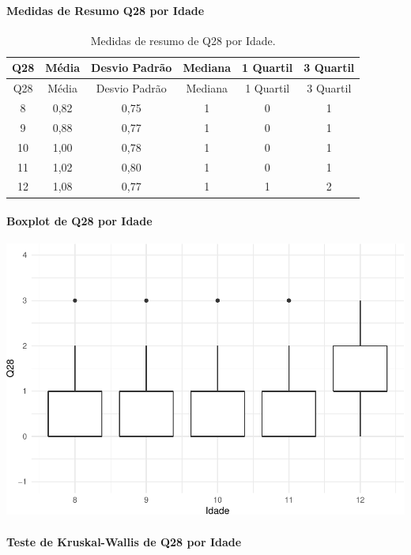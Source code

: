 \documentclass[]{article}
\let\oldparagraph\paragraph
\renewcommand{\paragraph}[1]{\oldparagraph{#1}\mbox{}}
\begin{document}
\cleardoublepage

\hypertarget{medidas-de-resumo-q28-por-idade}{%
\paragraph{Medidas de Resumo Q28 por Idade}\label{medidas-de-resumo-q28-por-idade}}

\begin{longtable}[]{@{}cccccc@{}}
\caption{\label{tab:unnamed-chunk-863}Medidas de resumo de Q28 por Idade.}\tabularnewline
\toprule
Q28 & Média & Desvio Padrão & Mediana & 1 Quartil & 3 Quartil\tabularnewline
\midrule
\endfirsthead
\toprule
Q28 & Média & Desvio Padrão & Mediana & 1 Quartil & 3 Quartil\tabularnewline
\midrule
\endhead
8 & 0,82 & 0,75 & 1 & 0 & 1\tabularnewline
9 & 0,88 & 0,77 & 1 & 0 & 1\tabularnewline
10 & 1,00 & 0,78 & 1 & 0 & 1\tabularnewline
11 & 1,02 & 0,80 & 1 & 0 & 1\tabularnewline
12 & 1,08 & 0,77 & 1 & 1 & 2\tabularnewline
\bottomrule
\end{longtable}

\hypertarget{boxplot-de-q28-por-idade}{%
\paragraph{Boxplot de Q28 por Idade}\label{boxplot-de-q28-por-idade}}

\begin{center}\includegraphics[width=0.75\linewidth]{relatorio_covid19_files/figure-latex/unnamed-chunk-864-1} \end{center}

\hypertarget{teste-de-kruskal-wallis-de-q28-por-idade}{%
\paragraph{Teste de Kruskal-Wallis de Q28 por Idade}\label{teste-de-kruskal-wallis-de-q28-por-idade}}
\end{document}

